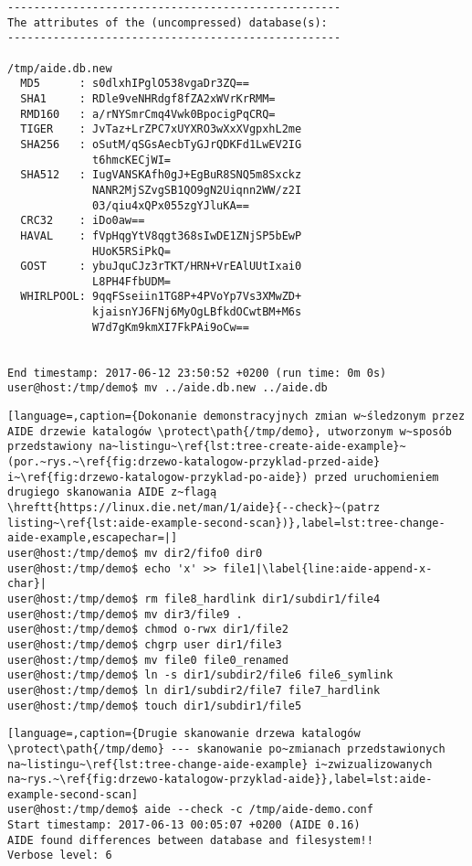 \documentclass[thesis]{subfiles}
\begin{document}
\begin{appendices}
\begin{minipage}{\linewidth}
\begin{lstlisting}
---------------------------------------------------
The attributes of the (uncompressed) database(s):
---------------------------------------------------

/tmp/aide.db.new
  MD5      : s0dlxhIPglO538vgaDr3ZQ==
  SHA1     : RDle9veNHRdgf8fZA2xWVrKrRMM=
  RMD160   : a/rNYSmrCmq4Vwk0BpocigPqCRQ=
  TIGER    : JvTaz+LrZPC7xUYXRO3wXxXVgpxhL2me
  SHA256   : oSutM/qSGsAecbTyGJrQDKFd1LwEV2IG
             t6hmcKECjWI=
  SHA512   : IugVANSKAfh0gJ+EgBuR8SNQ5m8Sxckz
             NANR2MjSZvgSB1QO9gN2Uiqnn2WW/z2I
             03/qiu4xQPx055zgYJluKA==
  CRC32    : iDo0aw==
  HAVAL    : fVpHqgYtV8qgt368sIwDE1ZNjSP5bEwP
             HUoK5RSiPkQ=
  GOST     : ybuJquCJz3rTKT/HRN+VrEAlUUtIxai0
             L8PH4FfbUDM=
  WHIRLPOOL: 9qqFSseiin1TG8P+4PVoYp7Vs3XMwZD+
             kjaisnYJ6FNj6MyOgLBfkdOCwtBM+M6s
             W7d7gKm9kmXI7FkPAi9oCw==


End timestamp: 2017-06-12 23:50:52 +0200 (run time: 0m 0s)
user@host:/tmp/demo$ mv ../aide.db.new ../aide.db
\end{lstlisting}
\end{minipage}

\vfill

\begin{lstlisting}[language=,caption={Dokonanie demonstracyjnych zmian w~śledzonym przez AIDE drzewie katalogów \protect\path{/tmp/demo}, utworzonym w~sposób przedstawiony na~listingu~\ref{lst:tree-create-aide-example}~(por.~rys.~\ref{fig:drzewo-katalogow-przyklad-przed-aide} i~\ref{fig:drzewo-katalogow-przyklad-po-aide}) przed uruchomieniem drugiego skanowania AIDE z~flagą \hreftt{https://linux.die.net/man/1/aide}{--check}~(patrz listing~\ref{lst:aide-example-second-scan})},label=lst:tree-change-aide-example,escapechar=|]
user@host:/tmp/demo$ mv dir2/fifo0 dir0
user@host:/tmp/demo$ echo 'x' >> file1|\label{line:aide-append-x-char}|
user@host:/tmp/demo$ rm file8_hardlink dir1/subdir1/file4
user@host:/tmp/demo$ mv dir3/file9 .
user@host:/tmp/demo$ chmod o-rwx dir1/file2
user@host:/tmp/demo$ chgrp user dir1/file3
user@host:/tmp/demo$ mv file0 file0_renamed
user@host:/tmp/demo$ ln -s dir1/subdir2/file6 file6_symlink
user@host:/tmp/demo$ ln dir1/subdir2/file7 file7_hardlink
user@host:/tmp/demo$ touch dir1/subdir1/file5
\end{lstlisting}

\newpage
\begin{lstlisting}[language=,caption={Drugie skanowanie drzewa katalogów \protect\path{/tmp/demo} --- skanowanie po~zmianach przedstawionych na~listingu~\ref{lst:tree-change-aide-example} i~zwizualizowanych na~rys.~\ref{fig:drzewo-katalogow-przyklad-aide}},label=lst:aide-example-second-scan]
user@host:/tmp/demo$ aide --check -c /tmp/aide-demo.conf 
Start timestamp: 2017-06-13 00:05:07 +0200 (AIDE 0.16)
AIDE found differences between database and filesystem!!
Verbose level: 6


\end{lstlisting}
\end{appendices}
\end{document}
